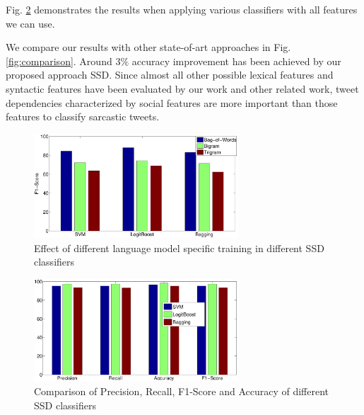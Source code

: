 Fig. \ref{fig:classifier} demonstrates the results when applying various classifiers with all features we can use. 

We compare our results with other state-of-art approaches in Fig. \ref{fig:comparison}. Around $3\%$ accuracy improvement has been achieved by our proposed approach SSD. Since almost all other possible lexical features and syntactic features have been evaluated by our work and other related work, tweet dependencies characterized by social features are more important than those features to classify sarcastic tweets.

\begin{figure}[hbt]
\centering
\includegraphics[width=3in, height= 2.4 in]{./figs/bow.eps}
\caption{Effect of different language model specific training in different SSD classifiers}
\label{train:fig}
\end{figure}

\begin{figure}[hbt]
\centering
\includegraphics[width=3in, height= 2.4 in]{./figs/class.eps}
\caption{Comparison of Precision, Recall, F1-Score and Accuracy of different SSD classifiers}
\label{fig:classifier}
\end{figure}

